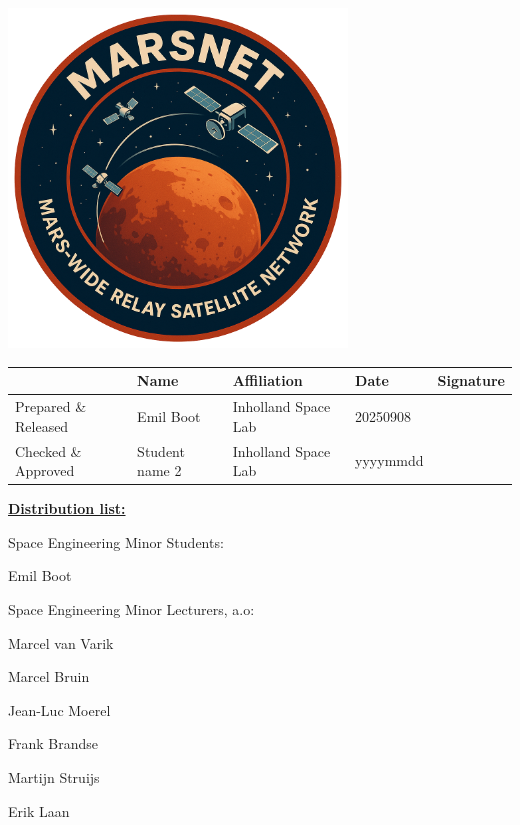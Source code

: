 
\maketitle
\vspace{-2cm}
\includegraphics[width=9cm, center]{media/MARSNET_missionpatch.png}
\vspace{1cm}

\begin{table}[htp]
\centering
\renewcommand{\arraystretch}{1.2} %
\begin{tabularx}{\textwidth}{p{2cm} X X X X }
 & Name & Affiliation & Date &  Signature\\
\hline
\raggedright{Prepared \& Released} & Emil Boot & Inholland Space Lab & 20250908\\
\hline
\raggedright{Checked \& Approved} & Student name 2 & Inholland Space Lab & yyyymmdd\\
\hline
\end{tabularx}
\end{table}



\textbf{\uline{Distribution list:}}

Space Engineering Minor Students:

Emil Boot

Space Engineering Minor Lecturers, a.o:

Marcel van Varik

Marcel Bruin

Jean-Luc Moerel

Frank Brandse

Martijn Struijs

Erik Laan
